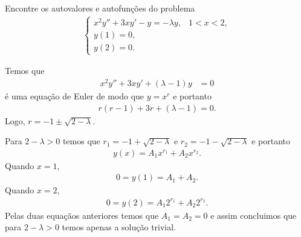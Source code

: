 \documentclass[a4paper,12pt, leqno, answers]{exam}
\begin{document}
\begin{questions}

    \question Encontre os autovalores e autofun\c{c}\~{o}es do problema
    \begin{align*}
        \begin{cases}
            x^2 y'' + 3 x y' - y = - \lambda y, & 1 < x < 2, \\
            y(1) = 0, \\
            y(2) = 0.
        \end{cases}
    \end{align*}
    \begin{solution}
        Temos que
        \begin{align*}
            x^2 y'' + 3 x y' + (\lambda - 1) y &= 0
        \end{align*}
        \'{e} uma equa\c{c}\~{a}o de Euler de modo que $y = x^r$ e portanto
        \begin{align*}
            r (r - 1) + 3 r + (\lambda - 1) = 0.
        \end{align*}
        Logo, $r = -1 \pm \sqrt{2 - \lambda}$.

        Para $2 - \lambda > 0$ temos que $r_1 = - 1 + \sqrt{2 - \lambda}$ e $r_2 = -1 - \sqrt{2 - \lambda}$ e portanto
        \begin{align*}
            y(x) = A_1 x^{r_1} + A_2 x^{r_2}.
        \end{align*}
        Quando $x = 1$,
        \begin{align*}
            0 = y(1) = A_1 + A_2.
        \end{align*}
        Quando $x = 2$,
        \begin{align*}
            0 = y(2) = A_1 2^{r_1} + A_2 2^{r_2}.
        \end{align*}
        Pelas duas equa\c{c}\~{a}os anteriores temos que $A_1 = A_2 = 0$ e assim concluimos que para $2 - \lambda > 0$ temos apenas a solu\c{c}\~{a}o trivial.


\end{solution}
\end{questions}
\end{document}
